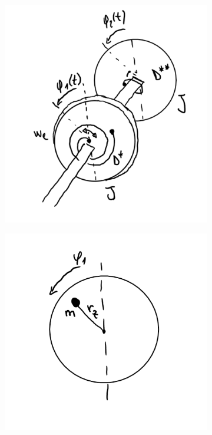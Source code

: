         \begin{figure}[htbp]
            \begin{subfigure}[c]{0.5\textwidth}
                \includegraphics[height=.3\textheight]{Bilder/Kapitel-1/Skizze zwei gekoppelter Torsionspendel.png}
            \end{subfigure}
            \begin{subfigure}[c]{0.5\textwidth}
                \includegraphics[height=.3\textheight]{Bilder/Kapitel-1/Skizze Torsionspendel 1 mit Zusatzmasse m.png}

\end{subfigure}
\end{figure}
